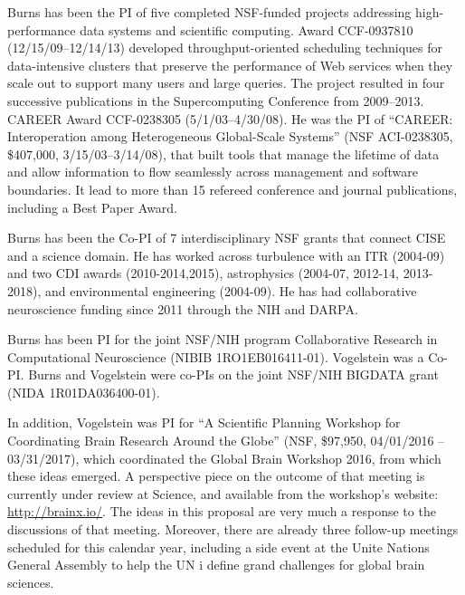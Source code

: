 
Burns has been the PI of five completed NSF-funded projects addressing high-performance data systems 
and scientific computing.   Award CCF-0937810 (12/15/09--12/14/13) developed throughput-oriented 
scheduling techniques for data-intensive clusters that preserve the performance of 
Web services when they scale out to support many users and large queries.  
The project resulted in four successive publications in the Supercomputing Conference from 2009--2013.
CAREER Award CCF-0238305 (5/1/03--4/30/08).  He was the PI of ``CAREER: Interoperation among Heterogeneous
Global-Scale Systems'' (NSF ACI-0238305, \$407,000, 3/15/03--3/14/08),  that built tools that manage the 
lifetime of data and allow information to flow seamlessly across management and software boundaries.  It lead
to more than 15 refereed conference and journal publications, including a Best Paper Award.

Burns has been the Co-PI of 7 interdisciplinary NSF grants that connect CISE and a science domain.
He has worked across turbulence with an ITR (2004-09) and two CDI awards (2010-2014,2015), 
astrophysics (2004-07, 2012-14, 2013-2018), and environmental engineering (2004-09).  He 
has had collaborative neuroscience funding since 2011 through the NIH and DARPA.

Burns has been PI for the joint NSF/NIH program Collaborative Research in Computational 
Neuroscience (NIBIB 1RO1EB016411-01).  Vogelstein was a Co-PI.  Burns and Vogelstein were
co-PIs on the joint NSF/NIH BIGDATA grant (NIDA 1R01DA036400-01).  

In addition, Vogelstein was PI for ``A Scientific Planning Workshop for Coordinating Brain Research Around the Globe''  (NSF, \$97,950, 04/01/2016 -- 03/31/2017), which coordinated the Global Brain Workshop 2016, from which these ideas emerged.  A perspective piece on the outcome of that meeting is currently under review at Science, and available from the workshop's website: \url{http://brainx.io/}.  The ideas in this proposal are very much a response to the discussions of that meeting.  Moreover, there are already three follow-up meetings scheduled for this calendar year, including a side event at the Unite Nations General Assembly to help the UN i
define grand challenges for global brain sciences.
